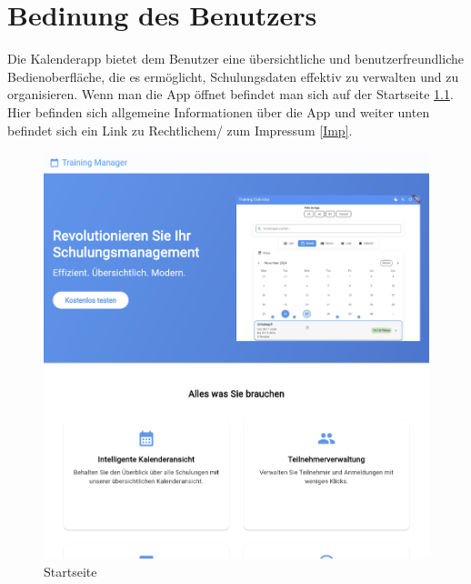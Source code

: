\chapter{Bedinung des Benutzers}

Die Kalenderapp bietet dem Benutzer eine übersichtliche und benutzerfreundliche Bedienoberfläche, die es ermöglicht, Schulungsdaten effektiv zu verwalten und zu organisieren. 
Wenn man die App öffnet befindet man sich auf der Startseite \ref{Home}.  Hier befinden sich allgemeine Informationen über die App und weiter unten befindet sich ein Link zu Rechtlichem/ zum Impressum \ref{Imp}.
\begin{figure}[htbp!]
        \centering
        \includegraphics[scale=0.2]{img/flutter_31.png}
        \caption{Startseite}
        \label{Home}
    \end{figure}

